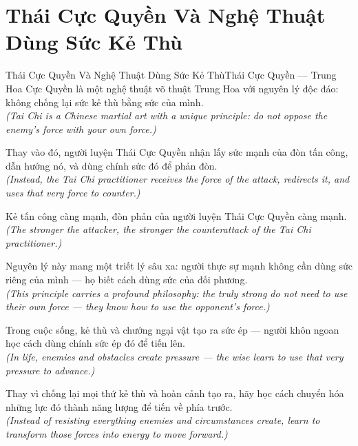 \section{Thái Cực Quyền Và Nghệ Thuật Dùng Sức Kẻ Thù}
\begin{truyen}{Thái Cực Quyền Và Nghệ Thuật Dùng Sức Kẻ Thù}{Thái Cực Quyền --- Trung Hoa}
 Cực Quyền là một nghệ thuật võ thuật Trung Hoa với nguyên lý độc đáo: không chống lại sức kẻ thù bằng sức của mình.\\[4pt]
\textit{(Tai Chi is a Chinese martial art with a unique principle: do not oppose the enemy's force with your own force.)}

Thay vào đó, người luyện Thái Cực Quyền nhận lấy sức mạnh của đòn tấn công, dẫn hướng nó, và dùng chính sức đó để phản đòn.\\[4pt]
\textit{(Instead, the Tai Chi practitioner receives the force of the attack, redirects it, and uses that very force to counter.)}

Kẻ tấn công càng mạnh, đòn phản của người luyện Thái Cực Quyền càng mạnh.\\[4pt]
\textit{(The stronger the attacker, the stronger the counterattack of the Tai Chi practitioner.)}

Nguyên lý này mang một triết lý sâu xa: người thực sự mạnh không cần dùng sức riêng của mình --- họ biết cách dùng sức của đối phương.\\[4pt]
\textit{(This principle carries a profound philosophy: the truly strong do not need to use their own force --- they know how to use the opponent's force.)}

Trong cuộc sống, kẻ thù và chướng ngại vật tạo ra sức ép --- người khôn ngoan học cách dùng chính sức ép đó để tiến lên.\\[4pt]
\textit{(In life, enemies and obstacles create pressure --- the wise learn to use that very pressure to advance.)}

\end{truyen}
\begin{baihoc}
  Thay vì chống lại mọi thứ kẻ thù và hoàn cảnh tạo ra, hãy học cách chuyển hóa những lực đó thành năng lượng để tiến về phía trước.\\[4pt]
  \textit{(Instead of resisting everything enemies and circumstances create, learn to transform those forces into energy to move forward.)}
\end{baihoc}

